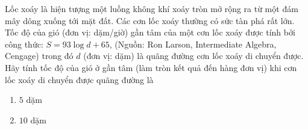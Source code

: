 \begin{vd}%
	Lốc xoáy là hiện tượng một luồng không khí xoáy tròn mở rộng ra từ một đám mây dông xuống tới mặt đất. Các cơn lốc xoáy thường có sức tàn phá rất lớn. Tốc độ của gió (đơn vị: dặm/giờ) gần tâm của một cơn lốc xoáy được tính bởi công thức: $S=93 \log d+65$, (Nguồn: Ron Larson, Intermediate Algebra, Cengage) trong đó $d$ (đơn vị: dặm) là quãng đường cơn lốc xoáy di chuyển được. Hãy tính tốc độ của gió ở gần tâm (làm tròn kết quả đến hàng đơn vị) khi cơn lốc xoáy di chuyển được quãng đường là
	\begin{multicols}{2}
		\begin{enumerate}
			\item $5$ dặm
			\item $10$ dặm
		\end{enumerate}
	\end{multicols}
\end{vd}
